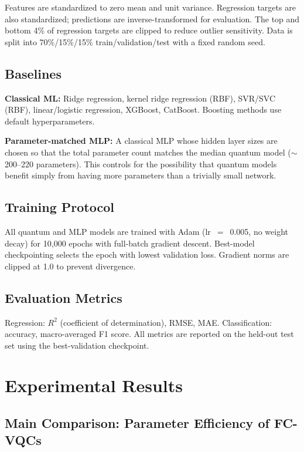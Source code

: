 \documentclass[10pt,conference]{IEEEtran}
\begin{document}
Features are standardized to zero mean and unit variance.
Regression targets are also standardized; predictions are inverse-transformed for evaluation.
The top and bottom 4\% of regression targets are clipped to reduce outlier sensitivity.
Data is split into 70\%/15\%/15\% train/validation/test with a fixed random seed.

\subsection{Baselines}

\textbf{Classical ML:} Ridge regression, kernel ridge regression (RBF), SVR/SVC (RBF), linear/logistic regression, XGBoost, CatBoost.
Boosting methods use default hyperparameters.

\textbf{Parameter-matched MLP:} A classical MLP whose hidden layer sizes are chosen so that the total parameter count matches the median quantum model (${\sim}$200--220 parameters).
This controls for the possibility that quantum models benefit simply from having more parameters than a trivially small network.

\subsection{Training Protocol}

All quantum and MLP models are trained with Adam (lr~$=$~0.005, no weight decay) for 10{,}000 epochs with full-batch gradient descent.
Best-model checkpointing selects the epoch with lowest validation loss.
Gradient norms are clipped at 1.0 to prevent divergence.

\subsection{Evaluation Metrics}

Regression: $R^2$ (coefficient of determination), RMSE, MAE.
Classification: accuracy, macro-averaged F1 score.
All metrics are reported on the held-out test set using the best-validation checkpoint.

\section{Experimental Results}
\label{sec:results}

\subsection{Main Comparison: Parameter Efficiency of FC-VQCs}
\end{document}
